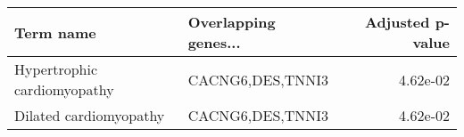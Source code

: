 \begin{tabular}{llr}
\toprule
                  Term name & Overlapping genes... &  Adjusted p-value \\
\midrule
Hypertrophic cardiomyopathy &     CACNG6,DES,TNNI3 &          4.62e-02 \\
     Dilated cardiomyopathy &     CACNG6,DES,TNNI3 &          4.62e-02 \\
\bottomrule
\end{tabular}
